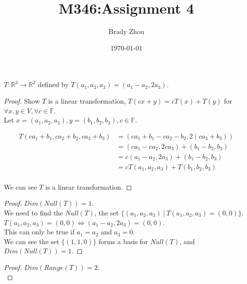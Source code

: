 \documentclass[12pt]{article}
\title{\textbf{M346:\@ Assignment 4}}
\author{Brady Zhou}
\date{\today}
\newenvironment{exercise}[2][Exercise]{\begin{trivlist}
\item[\hskip \labelsep{\bfseries #1}\hskip \labelsep{\bfseries #2.}]}{\end{trivlist}}
\begin{document}
\maketitle

\begin{exercise}{2.1.2} $T: \mathbb{R}^3 \to \mathbb{R}^2$ defined by $T(a_1, a_2, a_3) = (a_1 - a_2, 2a_3)$.

    \begin{proof} Show $T$ is a linear transformation, $T(cx + y) = cT(x) + T(y)$ for $\forall x, y \in V, \forall c \in \mathbb{F}$. \\

        \noindent Let $x = (a_1, a_2, a_3), y = (b_1, b_2, b_3), c \in \mathbb{F}$.

        \begin{align*}
            T (ca_1 + b_1, ca_2 + b_2, ca_3 + b_3) 
            & = (ca_1 + b_1 - ca_2 - b_2, 2(ca_3 + b_3)) \\
            & = (ca_1 - ca_2, 2ca_3) + (b_1 - b_2, b_3) \\
            & = c(a_1 - a_2, 2a_3) + (b_1 - b_2, b_3) \\
            & = c T(a_1, a_2, a_3) + T(b_1, b_2, b_3) \\
        \end{align*}

        \noindent We can see $T$ is a linear transformation.

    \end{proof}

    \begin{proof} $Dim(Null(T)) = 1$. \\

        \noindent We need to find the $Null(T)$, the set $\{(a_1, a_2, a_3)\ |\ T(a_1, a_2, a_3) = (0, 0)\}$. \\
        $T(a_1, a_2, a_3) = (0, 0) \iff (a_1 - a_2, 2a_3) = (0, 0)$. \\
        This can only be true if $a_1 = a_2$ and $a_3 = 0$. \\
        We can see the set $\{(1, 1, 0)\}$ forms a basis for $Null(T)$, and $Dim(Null(T)) = 1$.

    \end{proof}

    \begin{proof} $Dim(Range(T)) = 2$. \\


\end{proof}
\end{exercise}
\end{document}
